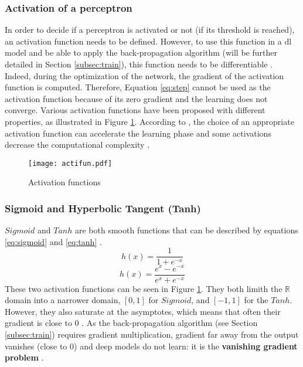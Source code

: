 \subsubsection{Activation of a perceptron} \label{subs:acti}
In order to decide if a perceptron is activated or not (if its threshold is reached), an activation function needs to be defined. However, to use this function in a \acrshort{dl} model and be able to apply the back-propagation algorithm (will be further detailed in Section \ref{subsec:train}), this function needs to be differentiable \cite{lecun_backpropagation_1989}. Indeed, during the optimization of the network, the gradient of the activation function is computed. Therefore, Equation \ref{eq:step} cannot be used as the activation function because of its zero gradient and the learning does not converge.  Various activation functions have been proposed with different properties, as illustrated in Figure \ref{fig:acti}. According to \textcite{khan_survey_2020}, the choice of an appropriate activation function can accelerate the learning phase and some activations decrease the computational complexity \cite{krizhevsky_imagenet_2012}.
%
\begin{figure}
    \centering
    \texttt{[image: actifun.pdf]}
    \caption{Activation functions}
    \label{fig:acti}
\end{figure}
%
\subsubsection{Sigmoid and Hyperbolic Tangent (Tanh)}
$Sigmoid$ and $Tanh$ are both smooth functions that can be described by equations \eqref{eq:sigmoid} and \eqref{eq:tanh} \cite{krizhevsky_imagenet_2012}.
%
\begin{equation}
    h(x) = \frac{1}{1 + e^{-x}}
    \label{eq:sigmoid}
\end{equation}
%
\begin{equation}
    h(x) = \frac{e^{x} - e^{-x}}{e^{x} + e^{-x}}
    \label{eq:tanh}
\end{equation}
%
These two activation functions can be seen in Figure \ref{fig:acti}. They both limith the $\mathbb{R}$ domain into a narrower domain, $[0, 1]$ for $Sigmoid$, and $[-1, 1]$ for the $Tanh$. However, they also saturate at the asymptotes, which means that often their gradient is close to 0 \cite{glorot_understanding_2010}. As the back-propagation algorithm (see Section \ref{subsec:train}) requires gradient multiplication, gradient far away from the output vanishes (close to 0) and deep models do not learn: it is the \textbf{vanishing gradient problem} \cite{goodfellow_deep_2016, khan_survey_2020, maas_rectier_2014}.
%
